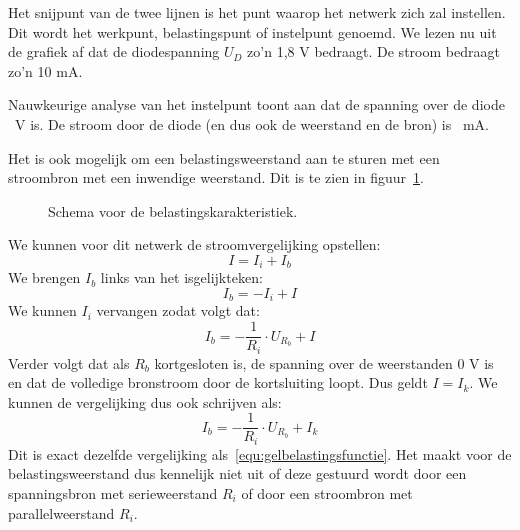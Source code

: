 Het snijpunt van de twee lijnen is het punt waarop het netwerk zich zal instellen. Dit wordt het werkpunt,
belastingspunt of instelpunt genoemd. We lezen nu uit de grafiek af dat de diodespanning $U_D$ zo'n 1,8 V
bedraagt. De stroom bedraagt zo'n 10 mA.

Nauwkeurige analyse van het instelpunt toont aan dat de spanning over de diode \udiode\ V is. De stroom door de
diode (en dus ook de weerstand en de bron) is \idiode\ mA.

Het is ook mogelijk om een belastingsweerstand aan te sturen met een stroombron met een inwendige weerstand.
Dit is te zien in figuur~\ref{fig:gelschemavoorbelastingskarakteristiekstroombron}.

\begin{figure}[!ht]
\centering
{}
\caption{Schema voor de belastingskarakteristiek.}
\label{fig:gelschemavoorbelastingskarakteristiekstroombron}
\end{figure}

We kunnen voor dit netwerk de stroomvergelijking opstellen:
%
\begin{equation}
I = I_i + I_b
\end{equation}
%
We brengen $I_b$ links van het isgelijkteken:
\begin{equation}
I_b = -I_i + I
\end{equation}
%
We kunnen $I_i$ vervangen zodat volgt dat:
%
\begin{equation}
I_b = -\dfrac{1}{R_i}\cdot U_{R_b} + I
\end{equation}
%
Verder volgt dat als $R_b$ kortgesloten is, de spanning over de weerstanden 0 V is en dat de
volledige bronstroom door de kortsluiting loopt. Dus geldt $I=I_k$. We kunnen de vergelijking
dus ook schrijven als:
%
\begin{equation}
I_b = -\dfrac{1}{R_i}\cdot U_{R_b} + I_k
\end{equation}
%
Dit is exact dezelfde vergelijking als~\eqref{equ:gelbelastingsfunctie}. Het maakt voor de belastingsweerstand
dus kennelijk niet uit of deze gestuurd wordt door een spanningsbron met serieweerstand $R_i$ of door een
stroombron met parallelweerstand $R_i$.


